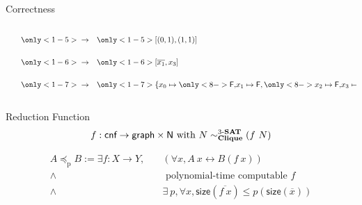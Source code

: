 \documentclass[11pt,usenames,dvipsnames,
  hyperref={pdfencoding=auto,psdextra}]{beamer}
\newcommand{\colorTikzA}{red}
\begin{document}
\begin{frame}[t]{Correctness}
\begin{overlayarea}{\textwidth}{0.25\textwidth}
\begin{columns}
\begin{column}{0.48 \textwidth}
\begin{center}
        \end{center}
      \end{column}
      \begin{column}{0.48 \textwidth}
        \begin{align*}
          \only<1-5>{\color{white}}\rightarrow \quad& \only<1-5>{\color{white}} [(0, 1), (1, 1)] \\[3.3ex]
          \only<1-6>{\color{white}} \rightarrow \quad& \only<1-6>{\color{white}} [\overline{x_1}, x_3] \\[3.3ex]
          \only<1-7> {\color{white}} \rightarrow \quad& \only<1-7>{\color{white}} \{x_0 \mapsto {\only<8->{\color{gray}}\bfalse,} x_1 \mapsto {\bfalse}, {\only<8->{\color{gray}} x_2 \mapsto \bfalse,} x_3 \mapsto {\btrue}\}
        \end{align*}
      \end{column}
    \end{columns}
  \end{overlayarea}

\end{frame}

\begin{frame}{Reduction Function}
  \[f : \textsf{cnf} \rightarrow \textsf{graph} \times \mathsf{N} \text{ with } N \sim^{\text{3-\textbf{SAT}}}_{\textbf{Clique}} (f~N) \]

  \color{gray}
  \begin{align*}
    A \preceq_{\text{p}} B := \exists f : X \rightarrow Y, \quad&(\forall x, A~x \leftrightarrow B(f~x)) \\
    \land& \text{ polynomial-time computable } f\\
    \land &\exists~p, \forall x, \textsf{size}{(\overline{f~x})} \le p(\textsf{size}{(\overline{x})})
  \end{align*}
\end{frame}
\end{document}
